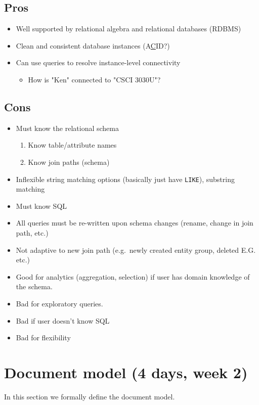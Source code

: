	\subsection{Pros}
		\begin{itemize}
			\item Well supported by relational algebra and relational databases (RDBMS)
			\item Clean and consistent database instances (A\underline{C}ID?)
			\item Can use queries to resolve instance-level connectivity
				\begin{itemize}
					\item How is "Ken" connected to "CSCI 3030U"?
				\end{itemize}
		\end{itemize}
	
	\subsection{Cons}
		\begin{itemize}
			\item Must know the relational schema
				\begin{enumerate}
					\item Know table/attribute names
					\item Know join paths (schema)
				\end{enumerate}
			\item Inflexible string matching options  (basically just have \texttt{LIKE}), substring matching
			\item Must know SQL
			\item All queries must be re-written upon schema changes (rename, change in join path, etc.)
			\item Not adaptive to new join path (e.g.\ newly created entity group, deleted E.G.\, etc.)
		\end{itemize}

	\begin{itemize}
		\item Good for analytics (aggregation, selection) if user has domain knowledge of the schema.
		\item Bad for exploratory queries.
		\item Bad if user doesn't know SQL
		\item Bad for flexibility
	\end{itemize}

\section{Document model (4 days, week 2)}
	In this section we formally define the document model.
	
